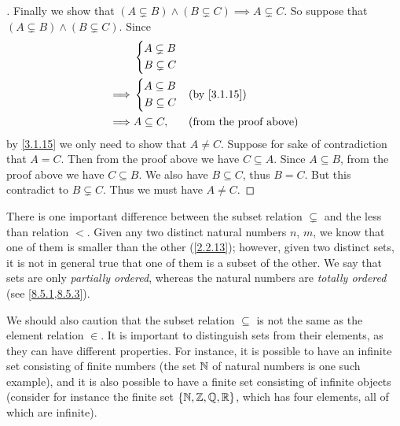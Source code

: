 \begin{proof}[]
  Finally we show that \((A \subsetneq B) \land (B \subsetneq C) \implies A \subsetneq C\).
  So suppose that  \((A \subsetneq B) \land (B \subsetneq C)\).
  Since
  \begin{align*}
             & \begin{dcases}
                 A \subsetneq B \\
                 B \subsetneq C
               \end{dcases}                                       \\
    \implies & \begin{dcases}
                 A \subseteq B \\
                 B \subseteq C
               \end{dcases}  &  & \by{3.1.15}                       \\
    \implies & A \subseteq C,    &  & \text{(from the proof above)}
  \end{align*}
  by \cref{3.1.15} we only need to show that \(A \neq C\).
  Suppose for sake of contradiction that \(A = C\).
  Then from the proof above we have \(C \subseteq A\).
  Since \(A \subseteq B\), from the proof above we have \(C \subseteq B\).
  We also have \(B \subseteq C\), thus \(B = C\).
  But this contradict to \(B \subsetneq C\).
  Thus we must have \(A \neq C\).
\end{proof}

\setcounter{thm}{19}
\begin{rmk}\label{3.1.20}
  There is one important difference between the subset relation \(\subsetneq\) and the less than relation \(<\).
  Given any two distinct natural numbers \(n\), \(m\), we know that one of them is smaller than the other (\cref{2.2.13});
  however, given two distinct sets, it is not in general true that one of them is a subset of the other.
  We say that sets are only \emph{partially ordered}, whereas the natural numbers are \emph{totally ordered} (see \cref{8.5.1,8.5.3}).
\end{rmk}

\begin{rmk}\label{3.1.21}
  We should also caution that the subset relation \(\subseteq\) is not the same as the element relation \(\in\).
  It is important to distinguish sets from their elements, as they can have different properties.
  For instance, it is possible to have an infinite set consisting of finite numbers (the set \(\mathbb{N}\) of natural numbers is one such example), and it is also possible to have a finite set consisting of infinite objects
  (consider for instance the finite set \(\left\lbrace\mathbb{N}, \mathbb{Z}, \mathbb{Q}, \mathbb{R}\right\rbrace\), which has four elements, all of which are infinite).
\end{rmk}

